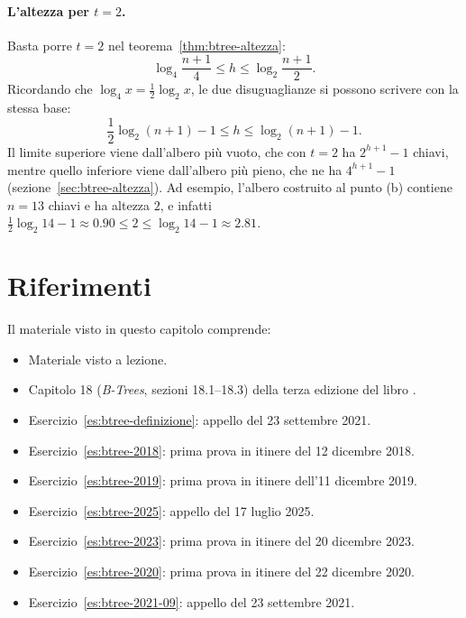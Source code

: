 \paragraph{L'altezza per $t = 2$.}
Basta porre $t = 2$ nel teorema~\ref{thm:btree-altezza}:
\[
\log_4 \frac{n+1}{4} \le h \le \log_2 \frac{n+1}{2}.
\]
Ricordando che $\log_4 x = \frac{1}{2}\log_2 x$, le due disuguaglianze si possono scrivere con la stessa base:
\[
\frac{1}{2}\log_2 (n+1) - 1 \le h \le \log_2 (n+1) - 1.
\]
Il limite superiore viene dall'albero più vuoto, che con $t = 2$ ha $2^{h+1} - 1$ chiavi, mentre quello inferiore viene dall'albero più pieno, che ne ha $4^{h+1} - 1$ (sezione~\ref{sec:btree-altezza}). Ad esempio, l'albero costruito al punto (b) contiene $n = 13$ chiavi e ha altezza $2$, e infatti $\frac{1}{2}\log_2 14 - 1 \approx 0.90 \le 2 \le \log_2 14 - 1 \approx 2.81$.

\clearpage

\section*{Riferimenti}
Il materiale visto in questo capitolo comprende:
\begin{itemize}
    \item Materiale visto a lezione.
    \item Capitolo 18 (\emph{B-Trees}, sezioni 18.1--18.3) della terza edizione del libro  \cite{Cormen-et-al-2009}.
    \item Esercizio~\ref{es:btree-definizione}: appello del 23 settembre 2021.
    \item Esercizio~\ref{es:btree-2018}: prima prova in itinere del 12 dicembre 2018.
    \item Esercizio~\ref{es:btree-2019}: prima prova in itinere dell'11 dicembre 2019.
    \item Esercizio~\ref{es:btree-2025}: appello del 17 luglio 2025.
    \item Esercizio~\ref{es:btree-2023}: prima prova in itinere del 20 dicembre 2023.
    \item Esercizio~\ref{es:btree-2020}: prima prova in itinere del 22 dicembre 2020.
    \item Esercizio~\ref{es:btree-2021-09}: appello del 23 settembre 2021.
\end{itemize}